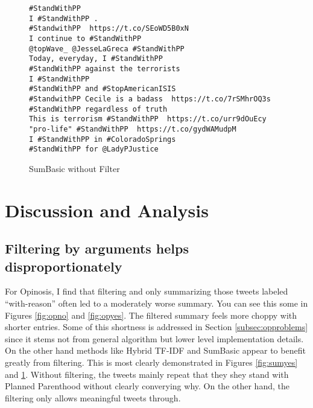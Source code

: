 \documentclass[paper=letter, fontsize=12pt]{article}
\begin{document}
\begin{figure}[h]
\begin{verbatim}
#StandWithPP
I #StandWithPP .
#StandwithPP  https://t.co/SEoWD5B0xN
I continue to #StandWithPP
@topWave_ @JesseLaGreca #StandWithPP
Today, everyday, I #StandWithPP
#StandWithPP against the terrorists
I #StandWithPP
#StandWithPP and #StopAmericanISIS
#StandwithPP Cecile is a badass  https://t.co/7rSMhrOQ3s
#StandWithPP regardless of truth
This is terrorism #StandWithPP  https://t.co/urr9dOuEcy
"pro-life" #StandWithPP  https://t.co/gydWAMudpM
I #StandWithPP in #ColoradoSprings
#StandWithPP for @LadyPJustice
\end{verbatim}
  \caption{SumBasic without Filter}
  \label{fig:sumno}
\end{figure}

\section{Discussion and Analysis}

\subsection{Filtering by arguments helps disproportionately}
For Opinosis, I find that filtering and only summarizing those tweets labeled ``with-reason'' often led to a moderately worse summary. You can see this some in Figures \ref{fig:opno} and \ref{fig:opyes}. The filtered summary feels more choppy with shorter entries. Some of this shortness is addressed in Section \ref{subsec:opproblems} since it stems not from general algorithm but lower level implementation details. On the other hand methods like Hybrid TF-IDF and SumBasic appear to benefit greatly from filtering. This is most clearly demonstrated in Figures \ref{fig:sumyes} and \ref{fig:sumno}. Without filtering, the tweets mainly repeat that they shey stand with Planned Parenthood without clearly converying why. On the other hand, the filtering only allows meaningful tweets through. 
\end{document}
